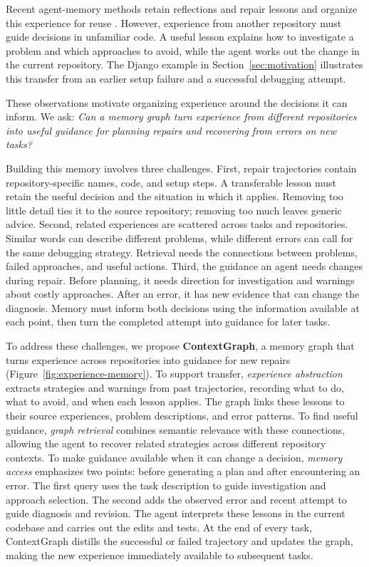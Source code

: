 \documentclass{article}
\begin{document}
Recent agent-memory methods retain reflections and repair lessons
\citep{reflexion2023,expel2024} and organize this experience for reuse
\citep{reasoningbank2026,ace2026}. However, experience from another repository
must guide decisions in unfamiliar code. A useful lesson explains how to
investigate a problem and which approaches to avoid, while the agent works
out the change in the current repository. The Django example in
Section~\ref{sec:motivation} illustrates this transfer from an earlier
setup failure and a successful debugging attempt.

These observations motivate organizing experience around the decisions it
can inform. We ask: \emph{Can a memory graph turn experience from different
repositories into useful guidance for planning repairs and recovering from
errors on new tasks?}

Building this memory involves three challenges. First, repair trajectories
contain repository-specific names, code, and setup steps. A transferable
lesson must retain the useful decision and the situation in which it applies.
Removing too little detail ties it to the source repository; removing too
much leaves generic advice. Second, related experiences are scattered across
tasks and repositories. Similar words can describe different problems, while
different errors can call for the same debugging strategy. Retrieval needs
the connections between problems, failed approaches, and useful actions.
Third, the guidance an agent needs changes during repair. Before planning,
it needs direction for investigation and warnings about costly approaches.
After an error, it has new evidence that can change the diagnosis. Memory
must inform both decisions using the information available at each point,
then turn the completed attempt into guidance for later tasks.

To address these challenges, we propose \textbf{ContextGraph}, a memory graph
that turns experience across repositories into guidance for new repairs
(Figure~\ref{fig:experience-memory}). To support transfer, \emph{experience
abstraction} extracts strategies and warnings from past trajectories,
recording what to do, what to avoid, and when each lesson applies. The graph
links these lessons to their source experiences, problem descriptions, and
error patterns. To find useful guidance, \emph{graph retrieval} combines
semantic relevance with these connections, allowing the agent to recover
related strategies across different repository contexts. To make guidance
available when it can change a decision, \emph{memory access} emphasizes two
points: before generating a plan and after encountering an error. The first
query uses the task description to guide investigation and approach
selection. The second adds the observed error and recent attempt to guide
diagnosis and revision. The agent interprets these lessons in the current
codebase and carries out the edits and tests. At the end of every task,
ContextGraph distills the successful or failed trajectory and updates the
graph, making the new experience immediately available to subsequent tasks.
\end{document}
